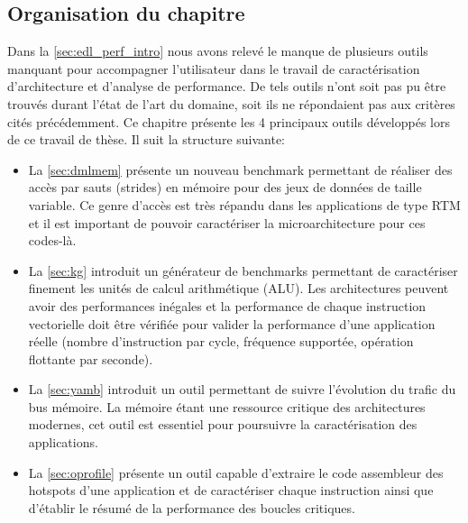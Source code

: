 \subsection{Organisation du chapitre}
    
    Dans la \autoref{sec:edl_perf_intro} nous avons relevé le manque de plusieurs outils manquant pour accompagner l'utilisateur dans le travail de caractérisation d'architecture et d'analyse de performance. De tels outils n'ont soit pas pu être trouvés durant l'état de l'art du domaine, soit ils ne répondaient pas aux critères cités précédemment. Ce chapitre présente les 4 principaux outils développés lors de ce travail de thèse. Il suit la structure suivante:
   
   \begin{itemize}
       \item La \autoref{sec:dmlmem} présente un nouveau \gls{benchmark} permettant de réaliser des accès par sauts (strides) en mémoire pour des jeux de données de taille variable. Ce genre d'accès est très répandu dans les applications de type RTM et il est important de pouvoir caractériser la microarchitecture pour ces codes-là.
       \item La \autoref{sec:kg} introduit un générateur de benchmarks permettant de caractériser finement les unités de calcul arithmétique (ALU). Les architectures peuvent avoir des performances inégales et la performance de chaque instruction vectorielle doit être vérifiée pour valider la performance d'une application réelle (nombre d'instruction par cycle, fréquence supportée, opération flottante par seconde).
       \item La \autoref{sec:yamb} introduit un outil permettant de suivre l'évolution du trafic du bus mémoire. La mémoire étant une ressource critique des architectures modernes, cet outil est essentiel pour poursuivre la caractérisation des applications.
       \item La \autoref{sec:oprofile} présente un outil capable d'extraire le code assembleur des \glspl{hotspot} d'une application et de caractériser chaque instruction ainsi que d'établir le résumé de la performance des boucles critiques.
   \end{itemize}
   
     


   
    
